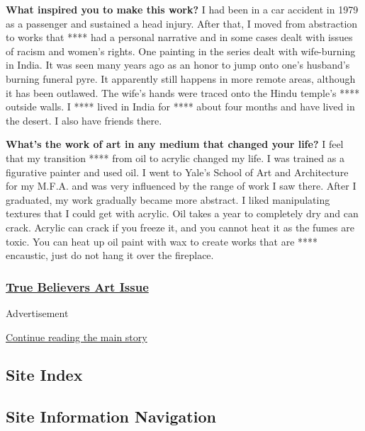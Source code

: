 \textbf{What inspired you to make this work?} I had been in a car
accident in 1979 as a passenger and sustained a head injury. After that,
I moved from abstraction to works that **** had a personal narrative and
in some cases dealt with issues of racism and women's rights. One
painting in the series dealt with wife-burning in India. It was seen
many years ago as an honor to jump onto one's husband's burning funeral
pyre. It apparently still happens in more remote areas, although it has
been outlawed. The wife's hands were traced onto the Hindu temple's ****
outside walls. I **** lived in India for **** about four months and have
lived in the desert. I also have friends there.

\textbf{What's the work of art in any medium that changed your life?} I
feel that my transition **** from oil to acrylic changed my life. I was
trained as a figurative painter and used oil. I went to Yale's School of
Art and Architecture for my M.F.A. and was very influenced by the range
of work I saw there. After I graduated, my work gradually became more
abstract. I liked manipulating textures that I could get with acrylic.
Oil takes a year to completely dry and can crack. Acrylic can crack if
you freeze it, and you cannot heat it as the fumes are toxic. You can
heat up oil paint with wax to create works that are **** encaustic, just
do not hang it over the fireplace.

\hypertarget{true-believers-art-issue}{%
\subsubsection{\texorpdfstring{\href{https://www.nytimes3xbfgragh.onion/issue/t-magazine/2020/07/02/true-believers-art-issue}{True
Believers Art
Issue}}{True Believers Art Issue}}\label{true-believers-art-issue}}

Advertisement

\protect\hyperlink{after-bottom}{Continue reading the main story}

\hypertarget{site-index}{%
\subsection{Site Index}\label{site-index}}

\hypertarget{site-information-navigation}{%
\subsection{Site Information
Navigation}\label{site-information-navigation}}

